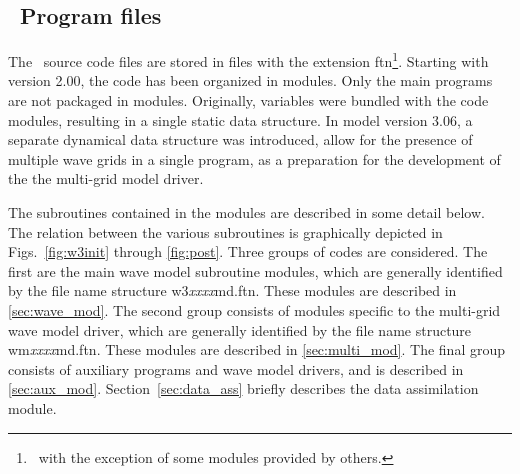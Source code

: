 \vssub
\subsection{~Program files} \label{sec:files}
\vssub

The \ws\ source code files are stored in files with the extension {\file
  ftn}\footnote{~with the exception of some modules provided by others.}.
Starting with version 2.00, the code has been organized in modules. Only the
main programs are not packaged in modules.  Originally, variables were bundled
with the code modules, resulting in a single static data structure. In model
version 3.06, a separate dynamical data structure was introduced, allow for
the presence of multiple wave grids in a single program, as a preparation for
the development of the the multi-grid model driver.

The subroutines contained in the modules are described in some detail below.
The relation between the various subroutines is graphically depicted in
Figs.~\ref{fig:w3init} through \ref{fig:post}. Three groups of codes are
considered. The first are the main wave model subroutine modules, which are
generally identified by the file name structure {\file
  w3{\it{xxxx}}md.ftn}. These modules are described
in \para\ref{sec:wave_mod}.  The second group consists of modules specific to
the multi-grid wave model driver, which are generally identified by the file
name structure {\file wm{\it{xxxx}}md.ftn}. These modules are described
in \para\ref{sec:multi_mod}.  The final group consists of auxiliary programs
and wave model drivers, and is described
in \para\ref{sec:aux_mod}. Section~\ref{sec:data_ass} briefly describes the
data assimilation module.
